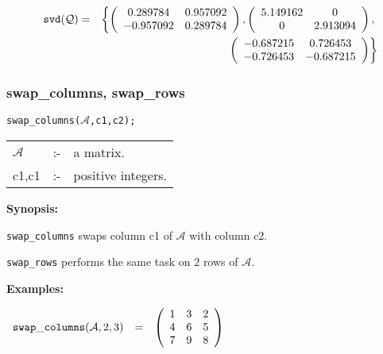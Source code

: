\begin{eqnarray}
\hspace*{0.1in}
{\tt svd({\cal Q})} & = & 
\left\{ 
        \left( \begin{array}{cc} 0.289784 & 0.957092 \\ -0.957092 & 
0.289784 \end{array} \right), \left( \begin{array}{cc} 5.149162 & 0 \\ 
0 & 2.913094 \end{array} \right), \right. \nonumber \\ & & \left. \: \; 
\, \left( \begin{array}{cc} -0.687215 & 0.726453 \\ -0.726453 & 
-0.687215 \end{array} \right)       
\right\} \nonumber
\end{eqnarray}


\subsubsection{swap\_columns, swap\_rows}
\label{linalg:swap_columns} 

\hspace*{0.175in} {\tt swap\_columns($\mathcal{A}$,c1,c2);}

\hspace*{0.1in} 
\begin{tabular}{l l l}
$\mathcal{A}$ &:-& a matrix. \\
c1,c1      &:-& positive integers. 
\end{tabular}

{\bf Synopsis:} %

\hspace*{0.175in} 
{\tt swap\_columns} swaps column c1 of $\mathcal{A}$ with column c2. 

\hspace*{0.175in} {\tt swap\_rows} performs the same task on 2 rows of 
                $\mathcal{A}$.

{\bf Examples:}

\begin{flushleft}  
\hspace*{0.1in}
\begin{math}  
\begin{array}{ccc}
{\tt swap\_columns}(\mathcal{A},2,3) & = & 
        \left( \begin{array}{ccc} 1 & 3 & 2 \\ 4 & 6 & 5 \\ 7 & 9 & 8
 \end{array} \right) 
\end{array}
\end{math}  
\end{flushleft}


